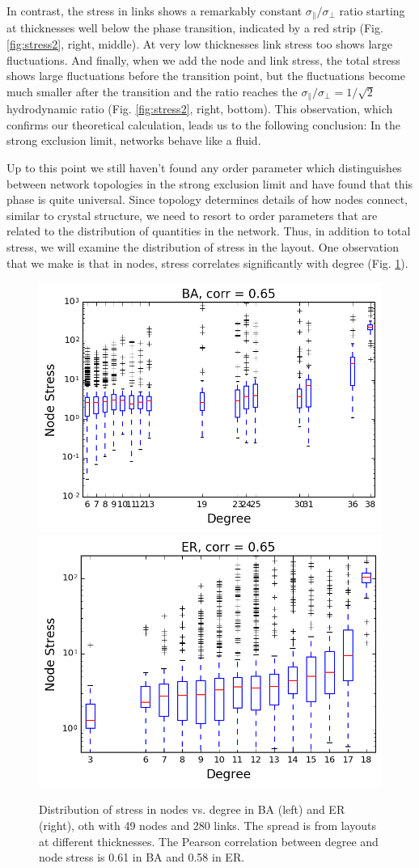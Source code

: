 \documentclass[nofootinbib,preprint,floatfix,endfloats]{revtex4} %
\begin{document}
In contrast, the stress in links shows a remarkably constant  $\sigma_\parallel/\sigma_\perp$ ratio starting at thicknesses well below the phase transition, indicated by a red strip (Fig. \ref{fig:stress2}, right, middle). 
At very low thicknesses link stress too shows large fluctuations. 
And finally, when we add the node and link stress, the total stress shows large fluctuations before the transition point, but the fluctuations become much smaller after the transition and the ratio  reaches the $\sigma_\parallel/\sigma_\perp = 1/\sqrt{2}$ hydrodynamic ratio (Fig. \ref{fig:stress2}, right, bottom). This observation, which confirms our theoretical calculation, leads us to the following conclusion: In the strong exclusion limit, networks behave like a fluid. 

Up to this point we still haven't found any order parameter which distinguishes between network topologies in the strong exclusion limit and have found that this phase is quite universal. 
Since topology determines details of how nodes connect, similar to crystal structure, we need to resort to order parameters that are related to the distribution of quantities in the network. 
Thus, in addition to total stress, we will examine the distribution of stress in the layout. 
One observation that we make is that in nodes, stress correlates significantly with degree (Fig. \ref{fig:stress-k}). 
\begin{figure}
    \centering
    \vspace{10cm}
    \includegraphics[width=.4\columnwidth]{fig-09-19/stress-deg-ba.png}\includegraphics[width=.4\columnwidth]{fig-09-19/stress-deg-er.png}
    
    \caption{Distribution of stress in nodes vs. degree in BA (left) and ER (right), oth with 49 nodes and 280 links. The spread is from layouts at different thicknesses. The Pearson correlation between degree and node stress is 0.61 in BA and 0.58 in ER.}
    \label{fig:stress-k}
\end{figure}
\end{document}
